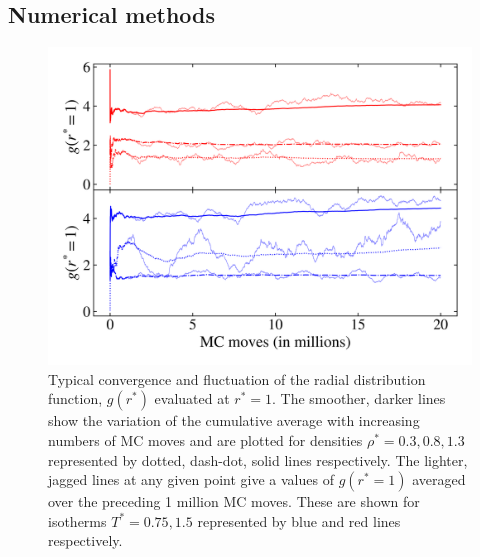 \documentclass[10pt, twocolumn]{revtex4}    %
\begin{document}
\subsection{Numerical methods} \label{ss:numerical}
\begin{figure}
	\includegraphics[width=\linewidth]{figures/convergence/gAtSigma_convergence.png}
	\caption{Typical convergence and fluctuation of the radial distribution function, $g(r^{*})$ evaluated at $r^{*}=1$. The smoother, darker lines show the variation of the cumulative average with increasing numbers of MC moves and are plotted for densities $\rho^{*} = 0.3, 0.8, 1.3$ represented by dotted, dash-dot, solid lines respectively. The lighter, jagged lines at any given point give a values of $g(r^{*}=1)$ averaged over the preceding 1 million MC moves. These are shown for isotherms $T^{*} = 0.75, 1.5$ represented by blue and red lines respectively. 
	}
	\label{fig:convergence}
\end{figure}
\end{document}
